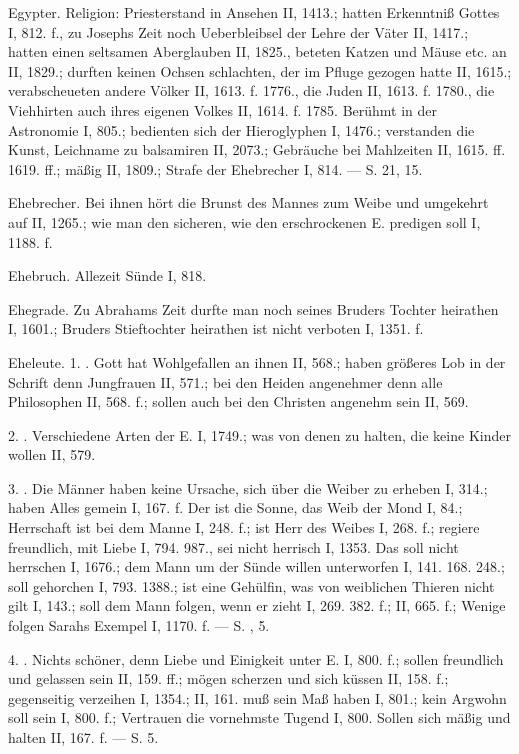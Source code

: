 Egypter. Religion: Priesterstand in Ansehen II, 1413.; hatten Erkenntniß Gottes I, 812. f., zu Josephs Zeit noch Ueberbleibsel der Lehre der Väter II, 1417.; hatten einen seltsamen Aberglauben II, 1825., beteten Katzen und Mäuse etc. an II, 1829.; durften keinen Ochsen schlachten, der im Pfluge gezogen hatte II, 1615.; verabscheueten andere Völker II, 1613. f. 1776., die Juden II, 1613. f. 1780., die Viehhirten auch ihres eigenen Volkes II, 1614. f. 1785. Berühmt in der Astronomie I, 805.; bedienten sich der Hieroglyphen I, 1476.; verstanden die Kunst, Leichname zu balsamiren II, 2073.; Gebräuche bei Mahlzeiten II, 1615. ff. 1619. ff.; mäßig II, 1809.; Strafe der Ehebrecher I, 814. — S.  21,  15.

Ehebrecher. Bei ihnen hört die Brunst des Mannes zum Weibe und umgekehrt auf II, 1265.; wie man den sicheren, wie den erschrockenen E. predigen soll I, 1188. f.

Ehebruch. Allezeit Sünde I, 818.

Ehegrade. Zu Abrahams Zeit durfte man noch seines Bruders Tochter heirathen I, 1601.; Bruders Stieftochter heirathen ist nicht verboten I, 1351. f.

Eheleute. 1. . Gott hat Wohlgefallen an ihnen II, 568.; haben größeres Lob in der Schrift denn Jungfrauen II, 571.; bei den Heiden angenehmer denn alle Philosophen II, 568. f.; sollen auch bei den Christen angenehm sein II, 569.

2. . Verschiedene Arten der E. I, 1749.; was von denen zu halten, die keine Kinder wollen II, 579.

3. . Die Männer haben keine Ursache, sich über die Weiber zu erheben I, 314.; haben Alles gemein I, 167. f. Der  ist die Sonne, das Weib der Mond I, 84.; Herrschaft ist bei dem Manne I, 248. f.; ist Herr des Weibes I, 268. f.; regiere freundlich, mit Liebe I, 794. 987., sei nicht herrisch I, 1353. Das  soll nicht herrschen I, 1676.; dem Mann um der Sünde willen unterworfen I, 141. 168. 248.; soll gehorchen I, 793. 1388.; ist eine Gehülfin, was von weiblichen Thieren nicht gilt I, 143.; soll dem Mann folgen, wenn er zieht I, 269. 382. f.; II, 665. f.; Wenige folgen Sarahs Exempel I, 1170. f. — S. ,  5.

4. . Nichts schöner, denn Liebe und Einigkeit unter E. I, 800. f.; sollen freundlich und gelassen sein II, 159. ff.; mögen scherzen und sich küssen II, 158. f.; gegenseitig verzeihen I, 1354.; II, 161.  muß sein Maß haben I, 801.; kein Argwohn soll sein I, 800. f.; Vertrauen die vornehmste Tugend I, 800. Sollen sich mäßig und  halten II, 167. f. — S.  5.

